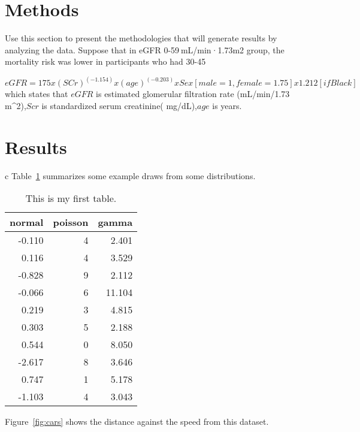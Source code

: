 \documentclass[12pt]{article}
\begin{document}
\section{Methods}
\label{sec:meth}

Use this section to present the methodologies that will generate results by
analyzing the data. Suppose that in eGFR 0-59 mL/min·1.73m2 group, the mortality risk was lower in participants who had 30-45%

\begin{equation}
eGFR = 175 x (SCr)^(-1.154) x(age)^(-0.203) xSex[male=1,female=1.75] x1.212 [if Black]
\end{equation}
which states that $eGFR$ is estimated glomerular filtration rate (mL/min/1.73 m^2),$Scr$ is standardized serum creatinine( mg/dL),$age$ is years.

\section{Results}
\label{sec:resu}
c
Table~\ref{tab:rv} summarizes some example draws from some distributions.
\lipsum[1-4]

\begin{table}[tbp]
  \caption{This is my first table.}
  \label{tab:rv}
\centering
\begin{tabular}{rrr}
  \toprule
normal & poisson & gamma \\ 
  \midrule
-0.110 & 4 & 2.401 \\ 
  0.116 & 4 & 3.529 \\ 
  -0.828 & 9 & 2.112 \\ 
  -0.066 & 6 & 11.104 \\ 
  0.219 & 3 & 4.815 \\ 
  0.303 & 5 & 2.188 \\ 
  0.544 & 0 & 8.050 \\ 
  -2.617 & 8 & 3.646 \\ 
  0.747 & 1 & 5.178 \\ 
  -1.103 & 4 & 3.043 \\ 
   \bottomrule
\end{tabular}
\end{table}

Figure~\ref{fig:cars} shows the distance against the speed from this dataset.
\end{document}

